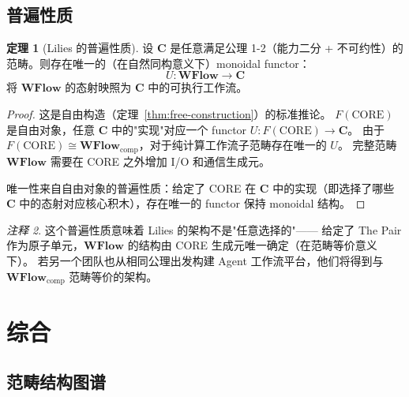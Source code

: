 \documentclass[11pt,a4paper]{article}
\theoremstyle{definition}
\newtheorem{theorem}{定理}[section]
\theoremstyle{definition}
\theoremstyle{remark}
\newtheorem{remark}[theorem]{注释}
\newcommand{\cat}[1]{\mathbf{#1}}
\newcommand{\catWFlow}{\cat{WFlow}}
\newcommand{\functor}[3]{#1: #2 \to #3}
\begin{document}
\subsection{普遍性质}

\begin{theorem}[Lilies 的普遍性质]
设 $\cat{C}$ 是任意满足公理 1-2（能力二分 + 不可约性）的范畴。则存在唯一的（在自然同构意义下）monoidal functor：
\[
\functor{U}{\catWFlow}{\cat{C}}
\]
将 $\catWFlow$ 的态射映照为 $\cat{C}$ 中的可执行工作流。
\label{thm:universal-property}
\end{theorem}

\begin{proof}
这是自由构造（定理~\ref{thm:free-construction}）的标准推论。
$F(\mathrm{CORE})$ 是自由对象，任意 $\cat{C}$ 中的"实现"对应一个 functor $U: F(\mathrm{CORE}) \to \cat{C}$。
由于 $F(\mathrm{CORE}) \cong \catWFlow_{\mathrm{comp}}$，对于纯计算工作流子范畴存在唯一的 $U$。
完整范畴 $\catWFlow$ 需要在 CORE 之外增加 I/O 和通信生成元。

唯一性来自自由对象的普遍性质：给定了 CORE 在 $\cat{C}$ 中的实现（即选择了哪些 $\cat{C}$ 中的态射对应核心积木），存在唯一的 functor 保持 monoidal 结构。
\end{proof}

\begin{remark}
这个普遍性质意味着 Lilies 的架构不是"任意选择的"——
给定了 The Pair 作为原子单元，$\catWFlow$ 的结构由 CORE 生成元唯一确定（在范畴等价意义下）。
若另一个团队也从相同公理出发构建 Agent 工作流平台，他们将得到与 $\catWFlow_{\mathrm{comp}}$ 范畴等价的架构。
\end{remark}

\section{综合}

\subsection{范畴结构图谱}
\end{document}
